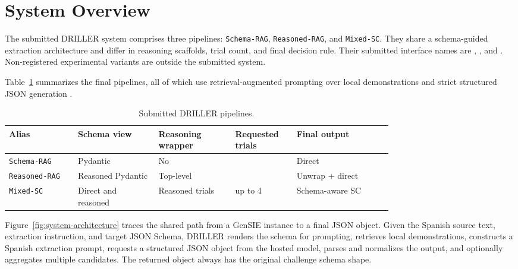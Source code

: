 \section{System Overview}

The submitted DRILLER system comprises three pipelines: \texttt{Schema-RAG}, \texttt{Reasoned-RAG}, and \texttt{Mixed-SC}. They share a schema-guided extraction architecture and differ in reasoning scaffolds, trial count, and final decision rule. Their submitted interface names are , , and . Non-registered experimental variants are outside the submitted system.

Table~\ref{tab:pipeline-overview} summarizes the final pipelines, all of which use retrieval-augmented prompting over local demonstrations \cite{lewis2020retrieval} and strict structured JSON generation \cite{geng2023grammar,willard2023efficient}.

\begin{table}[!htbp]
\centering
\small
\setlength{\tabcolsep}{4pt}
\caption{Submitted DRILLER pipelines.}
\label{tab:pipeline-overview}
\begin{tabularx}{\linewidth}{@{}>{\raggedright\arraybackslash}p{0.18\linewidth}
>{\raggedright\arraybackslash}p{0.21\linewidth}
>{\raggedright\arraybackslash}p{0.20\linewidth}
>{\centering\arraybackslash}p{0.16\linewidth}
>{\raggedright\arraybackslash}X@{}}
\toprule
Alias & Schema view & Reasoning wrapper & Requested trials & Final output \\
\midrule
\texttt{Schema-RAG} &
Pydantic &
No &
1 &
Direct \\
\texttt{Reasoned-RAG} &
Reasoned Pydantic &
Top-level &
1 &
Unwrap + direct \\
\texttt{Mixed-SC} &
Direct and reasoned &
Reasoned trials &
up to 4 &
Schema-aware SC \\
\bottomrule
\end{tabularx}
\end{table}

Figure~\ref{fig:system-architecture} traces the shared path from a GenSIE instance to a final JSON object. Given the Spanish source text, extraction instruction, and target JSON Schema, DRILLER renders the schema for prompting, retrieves local demonstrations, constructs a Spanish extraction prompt, requests a structured JSON object from the hosted model, parses and normalizes the output, and optionally aggregates multiple candidates. The returned object always has the original challenge schema shape.

